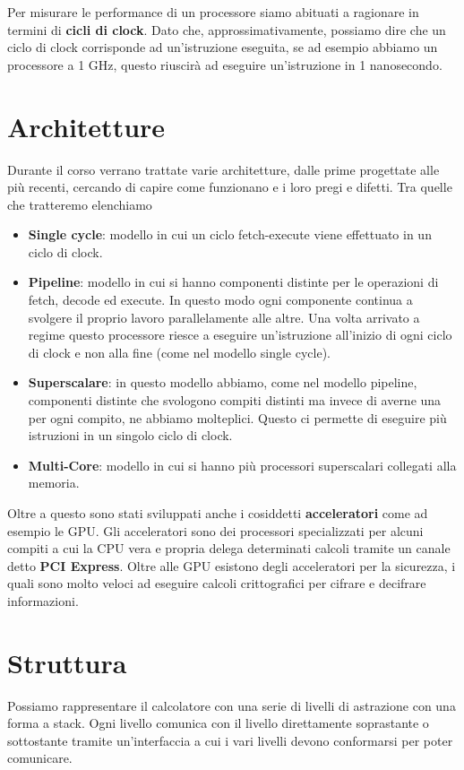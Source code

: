 Per misurare le performance di un processore siamo abituati a ragionare in termini di
\textbf{cicli di clock}. Dato che, approssimativamente, possiamo dire che un ciclo di clock
corrisponde ad un'istruzione eseguita, se ad esempio abbiamo un processore a 1 GHz, questo riuscirà
ad eseguire un'istruzione in 1 nanosecondo.

\section{Architetture}
Durante il corso verrano trattate varie architetture, dalle prime progettate alle più recenti,
cercando di capire come funzionano e i loro pregi e difetti. Tra quelle che tratteremo elenchiamo
\begin{itemize}
	\item \textbf{Single cycle}: modello in cui un ciclo fetch-execute viene effettuato in un ciclo
	      di clock.
	\item \textbf{Pipeline}: modello in cui si hanno componenti distinte per le operazioni di fetch,
	      decode ed execute. In questo modo ogni componente continua a svolgere il proprio lavoro
	      parallelamente alle altre. Una volta arrivato a regime questo processore riesce a
	      eseguire un'istruzione all'inizio di ogni ciclo di clock e non alla fine (come nel
	      modello single cycle).
	\item \textbf{Superscalare}: in questo modello abbiamo, come nel modello pipeline, componenti
	      distinte che svologono compiti distinti ma invece di averne una per ogni compito, ne
	      abbiamo molteplici. Questo ci permette di eseguire più istruzioni in un singolo ciclo
	      di clock.
	\item \textbf{Multi-Core}: modello in cui si hanno più processori superscalari collegati alla
	      memoria.
\end{itemize}

Oltre a questo sono stati sviluppati anche i cosiddetti \textbf{acceleratori} come ad esempio le
GPU. Gli acceleratori sono dei processori specializzati per alcuni compiti a cui la CPU vera e
propria delega determinati calcoli tramite un canale detto \textbf{PCI Express}. Oltre alle GPU
esistono degli acceleratori per la sicurezza, i quali sono molto veloci ad eseguire calcoli
crittografici per cifrare e decifrare informazioni.

\section{Struttura}
Possiamo rappresentare il calcolatore con una serie di livelli di astrazione con una forma a stack.
Ogni livello comunica con il livello direttamente soprastante o sottostante tramite un'interfaccia
a cui i vari livelli devono conformarsi per poter comunicare.

